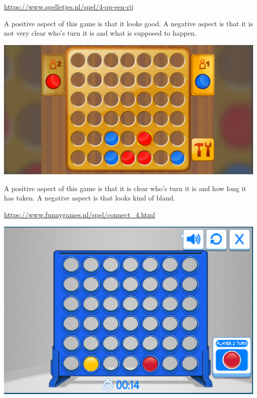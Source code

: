 \documentclass{article}
\begin{document}
     
     
     \url{https://www.spelletjes.nl/spel/4-op-een-rij}

    A positive aspect of this game is that it looks good. A negative aspect is that it is not very clear who's turn it is and what is supposed to happen.

     \includegraphics[width=\linewidth]{1}
     
     
     A positive aspect of this game is that it is clear who's turn it is and how long it has taken. A negative aspect is that looks kind of bland.

     \url{https://www.funnygames.nl/spel/connect_4.html}

     \includegraphics[width=\linewidth]{2}
\end{document}
